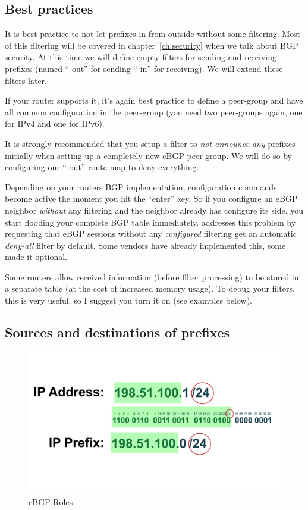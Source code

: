 \subsection{Best practices}
It is best practice to not let prefixes in from outside without some filtering. Most of this filtering will be covered in chapter~\ref{ch:security} when we talk about BGP security. At this time we will define empty filters for sending and receiving prefixes (named ``-out'' for sending ``-in'' for receiving). We will extend these filters later.

If your router supports it, it's again best practice to define a peer-group and have all common configuration in the peer-group (you need two peer-groups again, one for IPv4 and one for IPv6).

It is strongly recommended that you setup a filter to \emph{not announce any} prefixes initially when setting up a completely new eBGP peer group. We will do so by configuring our ``-out'' route-map to deny everything.

Depending on your routers BGP implementation, configuration commands become active the moment you hit the ``enter'' key. So if you configure an eBGP neighbor \emph{without} any filtering and the neighbor already has configure its side, you start flooding your complete BGP table immediately.  addresses this problem by requesting that eBGP sessions without any \emph{configured} filtering get an automatic \emph{deny-all} filter by default. Some vendors have already implemented this, some made it optional.

Some routers allow  received information (before filter processing) to be stored in a separate table (at the cost of increased memory usage). To debug your filters, this is very useful, so I suggest you turn it on (see examples below).

\subsection{Sources and destinations of prefixes}
\begin{figure}
  \centering
  \includegraphics[width=\linewidth,page=17]{img/Drawings.pdf}
  \caption{eBGP Roles}
  \label{fig:bgproles}
\end{figure}


